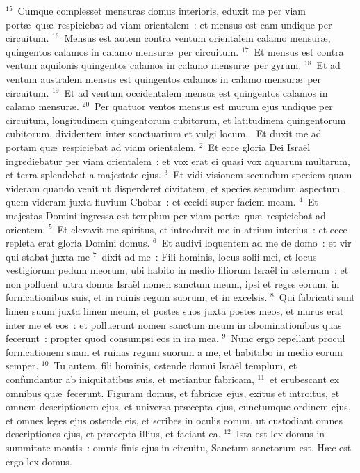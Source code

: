 ${}^{15}$~Cumque complesset mensuras domus interioris, eduxit me per viam port\ae\ qu\ae\ respiciebat ad viam orientalem~: et mensus est eam undique per circuitum.
${}^{16}$~Mensus est autem contra ventum orientalem calamo mensur\ae , quingentos calamos in calamo mensur\ae\ per circuitum.
${}^{17}$~Et mensus est contra ventum aquilonis quingentos calamos in calamo mensur\ae\ per gyrum.
${}^{18}$~Et ad ventum australem mensus est quingentos calamos in calamo mensur\ae\ per circuitum.
${}^{19}$~Et ad ventum occidentalem mensus est quingentos calamos in calamo mensur\ae .
${}^{20}$~Per quatuor ventos mensus est murum ejus undique per circuitum, longitudinem quingentorum cubitorum, et latitudinem quingentorum cubitorum, dividentem inter sanctuarium et vulgi locum.
~Et duxit me ad portam qu\ae\ respiciebat ad viam orientalem.
${}^{2}$~Et ecce gloria Dei Isra\"el ingrediebatur per viam orientalem~: et vox erat ei quasi vox aquarum multarum, et terra splendebat a majestate ejus.
${}^{3}$~Et vidi visionem secundum speciem quam videram quando venit ut disperderet civitatem, et species secundum aspectum quem videram juxta fluvium Chobar~: et cecidi super faciem meam.
${}^{4}$~Et majestas Domini ingressa est templum per viam port\ae\ qu\ae\ respiciebat ad orientem.
${}^{5}$~Et elevavit me spiritus, et introduxit me in atrium interius~: et ecce repleta erat gloria Domini domus.
${}^{6}$~Et audivi loquentem ad me de domo~: et vir qui stabat juxta me
${}^{7}$~dixit ad me~: Fili hominis, locus solii mei, et locus vestigiorum pedum meorum, ubi habito in medio filiorum Isra\"el in \ae ternum~: et non polluent ultra domus Isra\"el nomen sanctum meum, ipsi et reges eorum, in fornicationibus suis, et in ruinis regum suorum, et in excelsis.
${}^{8}$~Qui fabricati sunt limen suum juxta limen meum, et postes suos juxta postes meos, et murus erat inter me et eos~: et polluerunt nomen sanctum meum in abominationibus quas fecerunt~: propter quod consumpsi eos in ira mea.
${}^{9}$~Nunc ergo repellant procul fornicationem suam et ruinas regum suorum a me, et habitabo in medio eorum semper.
${}^{10}$~Tu autem, fili hominis, ostende domui Isra\"el templum, et confundantur ab iniquitatibus suis, et metiantur fabricam,
${}^{11}$~et erubescant ex omnibus qu\ae\ fecerunt. Figuram domus, et fabric\ae\ ejus, exitus et introitus, et omnem descriptionem ejus, et universa pr\ae cepta ejus, cunctumque ordinem ejus, et omnes leges ejus ostende eis, et scribes in oculis eorum, ut custodiant omnes descriptiones ejus, et pr\ae cepta illius, et faciant ea.
${}^{12}$~Ista est lex domus in summitate montis~: omnis finis ejus in circuitu, Sanctum sanctorum est. H\ae c est ergo lex domus.


